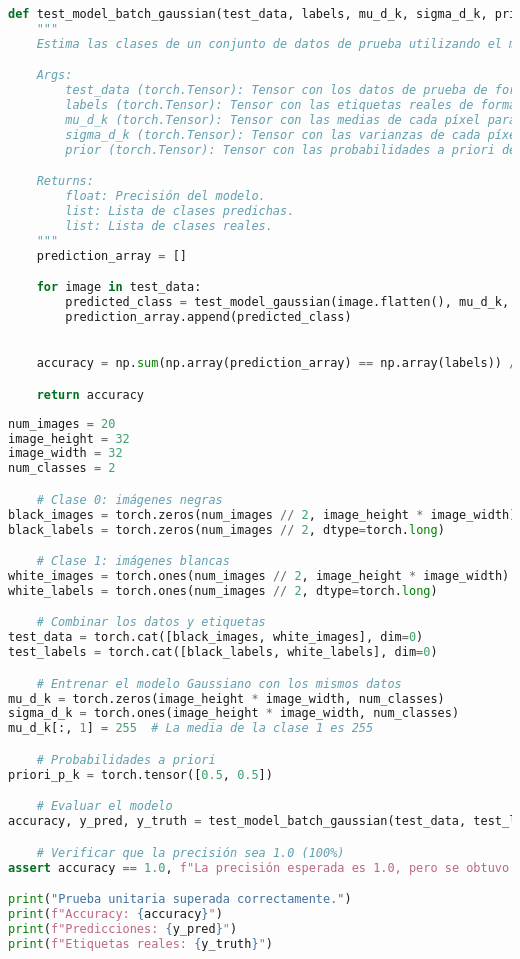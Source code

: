 \documentclass[spanish]{article}
\begin{document}
\begin{lstlisting}[language=Python, caption=Implementacion Batch Model]
def test_model_batch_gaussian(test_data, labels, mu_d_k, sigma_d_k, prior):
    """
    Estima las clases de un conjunto de datos de prueba utilizando el modelo Gaussiano.

    Args:
        test_data (torch.Tensor): Tensor con los datos de prueba de forma [N, D].
        labels (torch.Tensor): Tensor con las etiquetas reales de forma [N].
        mu_d_k (torch.Tensor): Tensor con las medias de cada píxel para cada clase de forma [D, K].
        sigma_d_k (torch.Tensor): Tensor con las varianzas de cada píxel para cada clase de forma [D, K].
        prior (torch.Tensor): Tensor con las probabilidades a priori de cada clase.

    Returns:
        float: Precisión del modelo.
        list: Lista de clases predichas.
        list: Lista de clases reales.
    """
    prediction_array = []

    for image in test_data:
        predicted_class = test_model_gaussian(image.flatten(), mu_d_k, sigma_d_k, prior)
        prediction_array.append(predicted_class)

    
    accuracy = np.sum(np.array(prediction_array) == np.array(labels)) / len(labels)

    return accuracy
\end{lstlisting}

\begin{lstlisting}[language=Python, caption=Prueba Unitaria Batch Model]
num_images = 20
image_height = 32
image_width = 32
num_classes = 2

    # Clase 0: imágenes negras
black_images = torch.zeros(num_images // 2, image_height * image_width)
black_labels = torch.zeros(num_images // 2, dtype=torch.long)

    # Clase 1: imágenes blancas
white_images = torch.ones(num_images // 2, image_height * image_width) * 255
white_labels = torch.ones(num_images // 2, dtype=torch.long)

    # Combinar los datos y etiquetas
test_data = torch.cat([black_images, white_images], dim=0)
test_labels = torch.cat([black_labels, white_labels], dim=0)

    # Entrenar el modelo Gaussiano con los mismos datos
mu_d_k = torch.zeros(image_height * image_width, num_classes)
sigma_d_k = torch.ones(image_height * image_width, num_classes)
mu_d_k[:, 1] = 255  # La media de la clase 1 es 255

    # Probabilidades a priori
priori_p_k = torch.tensor([0.5, 0.5])

    # Evaluar el modelo
accuracy, y_pred, y_truth = test_model_batch_gaussian(test_data, test_labels, mu_d_k, sigma_d_k, priori_p_k)

    # Verificar que la precisión sea 1.0 (100%)
assert accuracy == 1.0, f"La precisión esperada es 1.0, pero se obtuvo {accuracy}"

print("Prueba unitaria superada correctamente.")
print(f"Accuracy: {accuracy}")
print(f"Predicciones: {y_pred}")
print(f"Etiquetas reales: {y_truth}")
\end{lstlisting}
\end{document}

